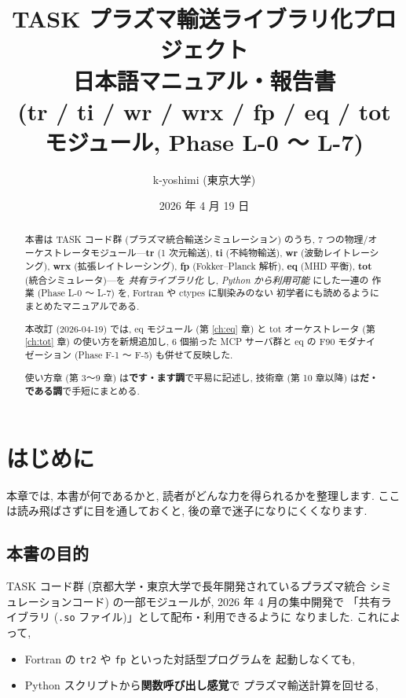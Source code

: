 \documentclass[11pt,a4paper]{report}
\title{\Huge TASK プラズマ輸送ライブラリ化プロジェクト\\
       \Large 日本語マニュアル・報告書 \\
       \large (tr / ti / wr / wrx / fp / eq / tot モジュール, Phase L-0 〜 L-7)}
\author{k-yoshimi (東京大学)}
\date{2026 年 4 月 19 日}
\begin{document}
\maketitle

\begin{abstract}\noindent
本書は TASK コード群 (プラズマ統合輸送シミュレーション) のうち,
7 つの物理/オーケストレータモジュール---\textbf{tr} (1 次元輸送),
\textbf{ti} (不純物輸送), \textbf{wr} (波動レイトレーシング),
\textbf{wrx} (拡張レイトレーシング), \textbf{fp} (Fokker--Planck 解析),
\textbf{eq} (MHD 平衡), \textbf{tot} (統合シミュレータ)---を
\emph{共有ライブラリ化} し, \emph{Python から利用可能} にした一連の
作業 (Phase L-0 〜 L-7) を, Fortran や ctypes に馴染みのない
初学者にも読めるようにまとめたマニュアルである.

本改訂 (2026-04-19) では, eq モジュール (第 \ref{ch:eq} 章) と
tot オーケストレータ (第 \ref{ch:tot} 章) の使い方を新規追加し,
6 個揃った MCP サーバ群と eq の F90 モダナイゼーション (Phase F-1
〜 F-5) も併せて反映した.

使い方章 (第 3〜9 章) は\textbf{です・ます調}で平易に記述し, 技術章
(第 10 章以降) は\textbf{だ・である調}で手短にまとめる.
\end{abstract}

\tableofcontents
\clearpage

\chapter{はじめに}
\label{ch:intro}

\begin{learn}
本章では, 本書が何であるかと, 読者がどんな力を得られるかを整理します.
ここは読み飛ばさずに目を通しておくと, 後の章で迷子になりにくくなります.
\end{learn}

\section{本書の目的}

TASK コード群 (京都大学・東京大学で長年開発されているプラズマ統合
シミュレーションコード) の一部モジュールが, 2026 年 4 月の集中開発で
「共有ライブラリ (\texttt{.so} ファイル)」として配布・利用できるように
なりました. これによって,

\begin{itemize}[leftmargin=1.5em]
  \item Fortran の \texttt{tr2} や \texttt{fp} といった対話型プログラムを
        起動しなくても,
  \item Python スクリプトから\textbf{関数呼び出し感覚}で
        プラズマ輸送計算を回せる,
\end{itemize}
\end{document}
